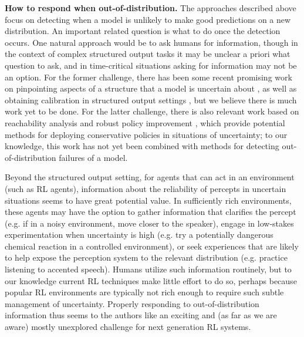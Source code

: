 \documentclass[a4paper,10pt]{article}
\begin{document}
{\bf How to respond when out-of-distribution.} The approaches described above focus on detecting when a model is unlikely to make good predictions on a new distribution. An important related question is what to do once the detection occurs. One natural approach would be to ask humans for information, though in the context of complex structured output tasks it may be unclear a priori what question to ask, and in time-critical situations asking for information may not be an option. For the former challenge, there has been some recent promising work on pinpointing aspects of a structure that a model is uncertain about \cite{werling2015job,khani2016unanimity}, as well as obtaining calibration in structured output settings \cite{kuleshov2015calibrated}, but we believe there is much work yet to be done. For the latter challenge, there is also relevant work based on reachability analysis \cite{lygeros1999controllers,mitchell2005time} and robust policy improvement \cite{wiesemann2013robust}, which provide potential methods for deploying conservative policies in situations of uncertainty; to our knowledge, this work has not yet been combined with methods for detecting out-of-distribution failures of a model.  

Beyond the structured output setting, for agents that can act in an environment (such as RL agents), information about the reliability of percepts in uncertain situations seems to have great potential value. In sufficiently rich environments, these agents may have the option to gather information that clarifies the percept (e.g. if in a noisy environment, move closer to the speaker), engage in low-stakes experimentation when uncertainty is high (e.g. try a potentially dangerous chemical reaction in a controlled environment), or seek experiences that are likely to help expose the perception system to the relevant distribution (e.g. practice listening to accented speech).  Humans utilize such information routinely, but to our knowledge current RL techniques make little effort to do so, perhaps because popular RL environments are typically not rich enough to require such subtle management of uncertainty.  Properly responding to out-of-distribution information thus seems to the authors like an exciting and (as far as we are aware) mostly unexplored challenge for next generation RL systems.
\end{document}
